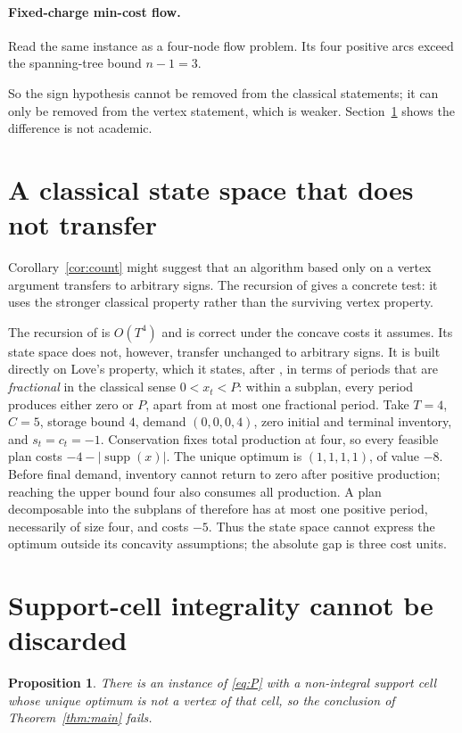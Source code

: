 \documentclass[3p,11pt]{elsarticle}
\newtheorem{proposition}[theorem]{Proposition}
\theoremstyle{remark}
\theoremstyle{definition}
\newcommand{\supp}{\operatorname{supp}}
\begin{document}
\paragraph{Fixed-charge min-cost flow.} Read the same instance as a four-node flow
problem. Its four positive arcs exceed the spanning-tree bound $n-1=3$.

So the sign hypothesis cannot be removed from the classical statements; it can only be
removed from the vertex statement, which is weaker. Section~\ref{sec:alg} shows the
difference is not academic.

\section{A classical state space that does not transfer}\label{sec:alg}

Corollary~\ref{cor:count} might suggest that an algorithm based only on a vertex argument
transfers to arbitrary signs. The recursion of \cite{apr15} gives a concrete test: it uses
the stronger classical property rather than the surviving vertex property.

The recursion of \cite{apr15} is $O(T^4)$ and is correct under the concave costs it
assumes. Its state space does not, however, transfer unchanged to arbitrary signs. It is
built directly on Love's property, which it states, after
\cite{love73}, in terms of periods that are \emph{fractional} in the classical sense
$0<x_t<P$: within a subplan, every period produces either zero or $P$, apart from at most
one fractional period. Take $T=4$, $C=5$, storage
bound $4$, demand $(0,0,0,4)$, zero initial and terminal inventory, and $s_t=c_t=-1$.
Conservation fixes total production at four, so every feasible plan costs
$-4-|\supp(x)|$. The unique optimum is $(1,1,1,1)$, of value $-8$. Before final demand,
inventory cannot return to zero after positive production; reaching the upper bound four
also consumes all production. A plan decomposable into the subplans of \cite{apr15}
therefore has at most one positive period, necessarily of size four, and costs $-5$.
Thus the state space cannot express the optimum outside its concavity assumptions; the
absolute gap is three cost units.

\section{Support-cell integrality cannot be discarded}\label{sec:sharp}

\begin{proposition}\label{prop:sharp}
There is an instance of \eqref{eq:P} with a non-integral support cell whose unique optimum
is not a vertex of that cell, so the conclusion of Theorem~\ref{thm:main} fails.
\end{proposition}
\end{document}
